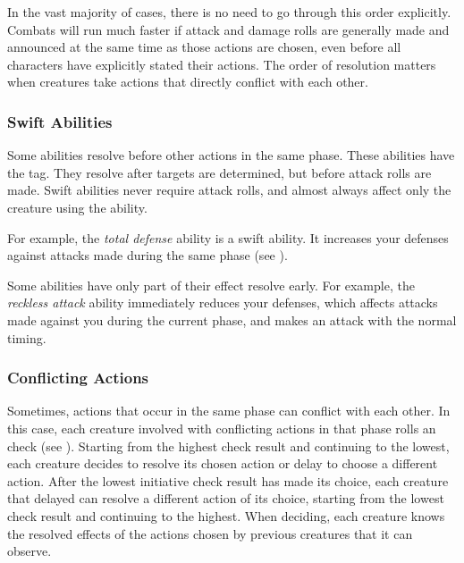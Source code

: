         In the vast majority of cases, there is no need to go through this order explicitly.
        Combats will run much faster if attack and damage rolls are generally made and announced at the same time as those actions are chosen, even before all characters have explicitly stated their actions.
        The order of resolution matters when creatures take actions that directly conflict with each other.

        \subsubsection{Swift Abilities}\label{Swift Abilities}
            Some abilities resolve before other actions in the same phase.
            These abilities have the  tag.
            They resolve after targets are determined, but before attack rolls are made.
            Swift abilities never require attack rolls, and almost always affect only the creature using the ability.

            For example, the \textit{total defense} ability is a swift ability.
            It increases your defenses against attacks made during the same phase (see ).

            Some abilities have only part of their effect resolve early.
            For example, the \textit{reckless attack} ability immediately reduces your defenses, which affects attacks made against you during the current phase, and makes an attack with the normal timing.

        \subsubsection{Conflicting Actions}\label{Conflicting Actions}

            Sometimes, actions that occur in the same phase can conflict with each other.
            In this case, each creature involved with conflicting actions in that phase rolls an  check (see ).
            Starting from the highest check result and continuing to the lowest, each creature decides to resolve its chosen action or delay to choose a different action.
            After the lowest initiative check result has made its choice, each creature that delayed can resolve a different action of its choice, starting from the lowest check result and continuing to the highest.
            When deciding, each creature knows the resolved effects of the actions chosen by previous creatures that it can observe.


